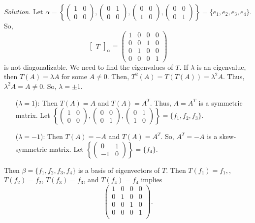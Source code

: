 \documentclass[12pt]{article}
\begin{document}
\textit{Solution.} Let $\alpha = \left\{ \begin{pmatrix}
1 & 0 \\ 0 & 0
\end{pmatrix}, \begin{pmatrix}
0 & 1 \\ 0 & 0
\end{pmatrix}, \begin{pmatrix}
0 & 0 \\ 1 & 0
\end{pmatrix}, \begin{pmatrix}
0 & 0 \\ 0 & 1
\end{pmatrix} \right\} = \{e_1, e_2, e_3, e_4\}$. So, $$\begin{bmatrix}
T
\end{bmatrix}_\alpha = \begin{pmatrix}
1 & 0 & 0 & 0 \\ 0 & 0 & 1 & 0 \\ 0 & 1 & 0 & 0 \\ 0 & 0 & 0 & 1
\end{pmatrix}$$ is not diagonalizable. We need to find the eigenvalues of $T$. If $\lambda$ is an eigenvalue, then $T(A) = \lambda A$ for some $A \neq 0$. Then, $T^2(A) = T(T(A)) = \lambda^2A$. Thus, $\lambda^2A = A \neq 0$. So, $\lambda = \pm 1$.
\begin{itemize}
    \item[($\lambda = 1$):] Then $T(A) = A$ and $T(A) = A^T$. Thus, $A = A^T$ is a symmetric matrix. Let $\left\{ \begin{pmatrix}
    1 & 0 \\ 0 & 0
    \end{pmatrix}, \begin{pmatrix}
    0 & 0 \\ 0 & 1
    \end{pmatrix}, \begin{pmatrix}
    0 & 1 \\ 1 & 0
    \end{pmatrix} \right\} = \{f_1, f_2, f_3\}$. 
    
    \item[($\lambda = -1$):] Then $T(A) = -A$ and $T(A) = A^T$. So, $A^T = -A$ is a skew-symmetric matrix. Let $\left\{ \begin{pmatrix}
    0 & 1 \\ -1 & 0
    \end{pmatrix} \right\} = \{f_4\}$.
\end{itemize}
Then $\beta = \{f_1, f_2, f_3, f_4\}$ is a basis of eigenvectors of $T$. Then $T(f_1) = f_1,$, $T(f_2) = f_2$, $T(f_3) = f_3$, and $T(f_4) = f_4$ implies $$\begin{pmatrix}
1 & 0 & 0 & 0 \\
0 & 1 & 0 & 0 \\
0 & 0 & 1 & 0 \\
0 & 0 & 0 & 1 \\
\end{pmatrix}.$$
\end{document}
